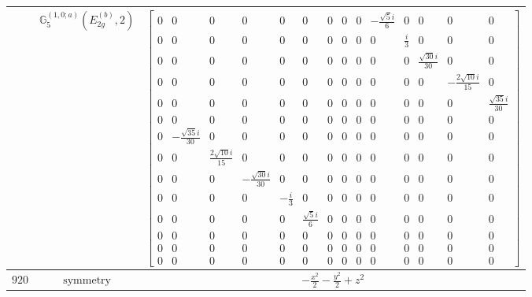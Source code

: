 \documentclass[fleqn,8pt,landscape]{jsarticle}
\begin{document}
\begin{longtable}{ccc}
$  $ & $ \mathbb{G}_{5}^{(1,0;a)}(E_{2g}^{(b)},2) $ & $ \begin{bmatrix} 0 & 0 & 0 & 0 & 0 & 0 & 0 & 0 & 0 & - \frac{\sqrt{5} i}{6} & 0 & 0 & 0 & 0 \\ 0 & 0 & 0 & 0 & 0 & 0 & 0 & 0 & 0 & 0 & \frac{i}{3} & 0 & 0 & 0 \\ 0 & 0 & 0 & 0 & 0 & 0 & 0 & 0 & 0 & 0 & 0 & \frac{\sqrt{30} i}{30} & 0 & 0 \\ 0 & 0 & 0 & 0 & 0 & 0 & 0 & 0 & 0 & 0 & 0 & 0 & - \frac{2 \sqrt{10} i}{15} & 0 \\ 0 & 0 & 0 & 0 & 0 & 0 & 0 & 0 & 0 & 0 & 0 & 0 & 0 & \frac{\sqrt{35} i}{30} \\ 0 & 0 & 0 & 0 & 0 & 0 & 0 & 0 & 0 & 0 & 0 & 0 & 0 & 0 \\ 0 & - \frac{\sqrt{35} i}{30} & 0 & 0 & 0 & 0 & 0 & 0 & 0 & 0 & 0 & 0 & 0 & 0 \\ 0 & 0 & \frac{2 \sqrt{10} i}{15} & 0 & 0 & 0 & 0 & 0 & 0 & 0 & 0 & 0 & 0 & 0 \\ 0 & 0 & 0 & - \frac{\sqrt{30} i}{30} & 0 & 0 & 0 & 0 & 0 & 0 & 0 & 0 & 0 & 0 \\ 0 & 0 & 0 & 0 & - \frac{i}{3} & 0 & 0 & 0 & 0 & 0 & 0 & 0 & 0 & 0 \\ 0 & 0 & 0 & 0 & 0 & \frac{\sqrt{5} i}{6} & 0 & 0 & 0 & 0 & 0 & 0 & 0 & 0 \\ 0 & 0 & 0 & 0 & 0 & 0 & 0 & 0 & 0 & 0 & 0 & 0 & 0 & 0 \\ 0 & 0 & 0 & 0 & 0 & 0 & 0 & 0 & 0 & 0 & 0 & 0 & 0 & 0 \\ 0 & 0 & 0 & 0 & 0 & 0 & 0 & 0 & 0 & 0 & 0 & 0 & 0 & 0 \end{bmatrix} $ \\ \hline
$ 920 $ & $ \text{symmetry} $ & $ - \frac{x^{2}}{2} - \frac{y^{2}}{2} + z^{2} $ \\

\end{longtable}
\end{document}
